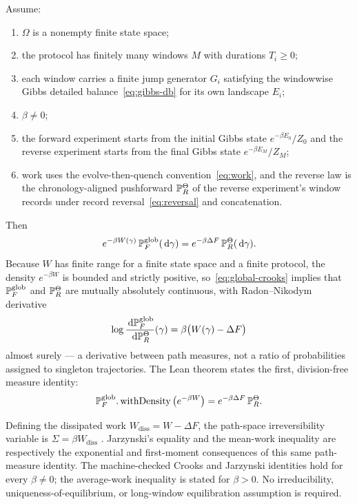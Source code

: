 \begin{theorem}
\label{thm:main}
Assume:
\begin{enumerate}[label=(\roman*),leftmargin=*,nosep]
  \item $\Omega$ is a nonempty finite state space;
  \item the protocol has finitely many windows $M$ with durations $T_i\ge 0$;
  \item each window carries a finite jump generator $G_i$ satisfying the windowwise Gibbs detailed balance~\eqref{eq:gibbs-db} for its own landscape $E_i$;
  \item $\beta\ne 0$;
  \item the forward experiment starts from the initial Gibbs state $e^{-\beta E_0}/Z_0$ and the reverse experiment starts from the final Gibbs state $e^{-\beta E_M}/Z_M$;
  \item work uses the evolve-then-quench convention~\eqref{eq:work}, and the reverse law is the chronology-aligned pushforward $\mathbb{P}_R^{\Theta}$ of the reverse experiment's window records under record reversal~\eqref{eq:reversal} and concatenation.
\end{enumerate}
Then
\begin{equation}
\label{eq:global-crooks}
  e^{-\beta W(\gamma)}\,\mathbb{P}_F^{\mathrm{glob}}(\,\mathrm{d}\gamma)
  =e^{-\beta\Delta F}\,\mathbb{P}_R^{\Theta}(\,\mathrm{d}\gamma).
\end{equation}
Because $W$ has finite range for a finite state space and a finite protocol, the density $e^{-\beta W}$ is bounded and strictly positive, so~\eqref{eq:global-crooks} implies that $\mathbb{P}_F^{\mathrm{glob}}$ and $\mathbb{P}_R^{\Theta}$ are mutually absolutely continuous, with Radon--Nikodym derivative
\begin{equation}
  \log\frac{\,\mathrm{d}\mathbb{P}_F^{\mathrm{glob}}}{\,\mathrm{d}\mathbb{P}_R^{\Theta}}(\gamma)
  =\beta\bigl(W(\gamma)-\Delta F\bigr)
\end{equation}
almost surely --- a derivative between path measures, not a ratio of probabilities assigned to singleton trajectories. The Lean theorem states the first, division-free measure identity:
\begin{equation}
\label{eq:global-crooks-lean}
  \mathbb{P}_F^{\mathrm{glob}}.\operatorname{withDensity}
  \left(e^{-\beta W}\right)
  = e^{-\beta\Delta F}\,\mathbb{P}_R^{\Theta}.
\end{equation}
\end{theorem}

Defining the dissipated work $W_{\mathrm{diss}}=W-\Delta F$, the path-space irreversibility variable is $\Sigma=\beta W_{\mathrm{diss}}$ \parencite{Seifert2012,VandenBroeckEsposito2015}. Jarzynski's equality and the mean-work inequality are respectively the exponential and first-moment consequences of this same path-measure identity. The machine-checked Crooks and Jarzynski identities hold for every $\beta\ne0$; the average-work inequality is stated for $\beta>0$. No irreducibility, uniqueness-of-equilibrium, or long-window equilibration assumption is required.

